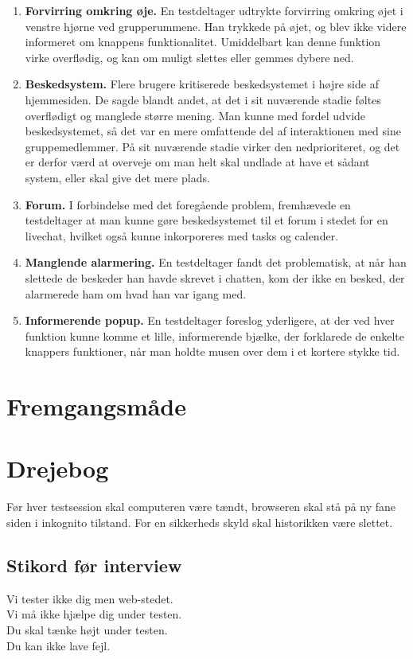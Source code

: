 \documentclass[12pt]{article}
\begin{document}
\begin{enumerate}
  \item \textbf{Forvirring omkring øje.} En testdeltager udtrykte forvirring omkring øjet i venstre hjørne ved grupperummene. Han trykkede på øjet, og blev ikke videre informeret om knappens funktionalitet. Umiddelbart kan denne funktion virke overflødig, og kan om muligt slettes eller gemmes dybere ned.

  \item \textbf{Beskedsystem.} Flere brugere kritiserede beskedsystemet i højre side af hjemmesiden. De sagde blandt andet, at det i sit nuværende stadie føltes overflødigt og manglede større mening. Man kunne med fordel udvide beskedsystemet, så det var en mere omfattende del af interaktionen med sine gruppemedlemmer. På sit nuværende stadie virker den nedprioriteret, og det er derfor værd at overveje om man helt skal undlade at have et sådant system, eller skal give det mere plads.

  \item \textbf{Forum.} I forbindelse med det foregående problem, fremhævede en testdeltager at man kunne gøre beskedsystemet til et forum i stedet for en livechat, hvilket også kunne inkorporeres med tasks og calender.
  
  \item \textbf{Manglende alarmering.} En testdeltager fandt det problematisk, at når han slettede de beskeder han havde skrevet i chatten, kom der ikke en besked, der alarmerede ham om hvad han var igang med.
  
  \item \textbf{Informerende popup.} En testdeltager foreslog yderligere, at der ved hver funktion kunne komme et lille, informerende bjælke, der forklarede de enkelte knappers funktioner, når man holdte musen over dem i et kortere stykke tid.
\end{enumerate}

\section{Fremgangsmåde}

\section{Drejebog}
Før hver testsession skal computeren være tændt, browseren skal stå på ny fane siden i inkognito tilstand. For en sikkerheds skyld skal historikken være slettet.
\subsection{Stikord før interview}
Vi tester ikke dig men web-stedet. \\
Vi må ikke hjælpe dig under testen. \\
Du skal tænke højt under testen. \\
Du kan ikke lave fejl.
\end{document}
